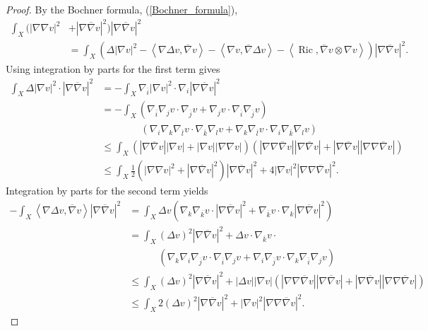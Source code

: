\documentclass[10pt,a4paper]{amsart}
\DeclareMathOperator{\Ric}{Ric}
\newcommand{\ip}[1]{\left\langle#1\right\rangle}
\newcommand{\oo}[1]{\overline{#1}}
\begin{document}
\begin{proof}
By the Bochner formula, (\ref{Bochner_formula}),
\begin{align*}
    \int_X (|\nabla \nabla v|^2 &+ |\nabla \oo{\nabla} v|^2) |\nabla \oo{\nabla} v|^2\\
    &= \int_X (\Delta |\nabla v|^2 - \ip{\nabla \Delta v, \oo{\nabla} v} - \ip{\nabla v, \oo{\nabla} \Delta v} - \ip{\Ric, \oo{\nabla} v \otimes \nabla v}) |\nabla \oo{\nabla} v|^2.
\end{align*}
Using integration by parts for the first term gives
\begin{align*}
    \int_X \Delta |\nabla v|^2 \cdot |\nabla \oo{\nabla} v|^2 &= -\int_X \nabla_{\oo{i}} |\nabla v|^2 \cdot \nabla_i |\nabla \oo{\nabla} v|^2\\
    &=  - \int_X (\nabla_{\oo{i}} \nabla_j v \cdot \nabla_{\oo{j}} v + \nabla_j v \cdot \nabla_{\oo{i}} \nabla_{\oo{j}} v)\\
    &\quad\quad\quad\quad(\nabla_i \nabla_k \nabla_{\oo{l}} v \cdot \nabla_{\oo{k}} \nabla_l v + \nabla_k \nabla_{\oo{l}}v \cdot \nabla_i \nabla_{\oo{k}} \nabla_l v)\\
    &\leq \int_X (|\nabla \oo{\nabla} v| |\nabla v| + |\nabla v| |\nabla \nabla v|)(|\nabla \nabla \oo{\nabla} v| |\nabla \oo{\nabla} v| + |\nabla \oo{\nabla} v| |\nabla \nabla \oo{\nabla} v|)\\
    &\leq \int_X \frac{1}{2}(|\nabla \nabla v|^2 + |\nabla \oo{\nabla} v|^2) |\nabla \oo{\nabla} v|^2 + 4 |\nabla v|^2 |\nabla \nabla \oo{\nabla} v|^2.
\end{align*}
Integration by parts for the second term yields
{\allowdisplaybreaks
\begin{align*}
    -\int_X \ip{\nabla \Delta v, \oo{\nabla} v} |\nabla \oo{\nabla} v|^2 &= \int_X \Delta v (\nabla_k \nabla_{\oo{k}} v \cdot |\nabla \oo{\nabla} v|^2 + \nabla_{\oo{k}} v \cdot \nabla_k |\nabla \oo{\nabla} v|^2)\\
    &= \int_X (\Delta v)^2 |\nabla \oo{\nabla} v|^2 + \Delta v \cdot \nabla_{\oo{k}} v \cdot\\
    &\quad\quad\quad(\nabla_k \nabla_i \nabla_{\oo{j}} v \cdot \nabla_{\oo{i}} \nabla_j v + \nabla_i \nabla_{\oo{j}} v \cdot \nabla_k \nabla_{\oo{i}} \nabla_j v)\\
    &\leq \int_X (\Delta v)^2 |\nabla\oo{\nabla} v|^2 + |\Delta v| |\nabla v| (|\nabla \nabla \oo{\nabla} v||\nabla \oo{\nabla} v| + |\nabla \oo{\nabla} v| |\nabla \nabla \oo{\nabla} v|)\\
    &\leq \int_X 2(\Delta v)^2 |\nabla \oo{\nabla} v|^2 + |\nabla v|^2 |\nabla\nabla \oo{\nabla} v|^2. 

\end{align*}}
\end{proof}
\end{document}
